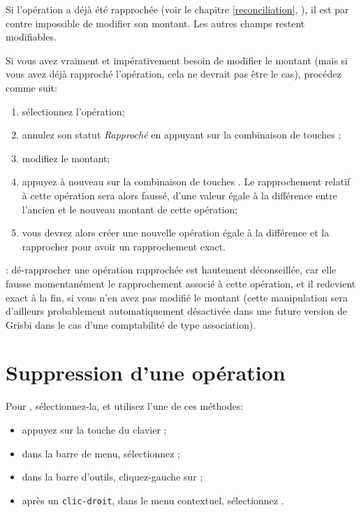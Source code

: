 Si l'opération a déjà été rapprochée (voir le chapitre \vref{reconciliation}, ), il est par contre impossible de modifier son montant. Les autres champs restent modifiables.

Si vous avez vraiment et impérativement besoin de modifier le montant (mais si vous avez déjà rapproché l'opération, cela ne devrait pas être le cas), procédez comme suit:
\begin{enumerate}
	\item sélectionnez l'opération;
	\item annulez son statut \emph{Rapproché} en appuyant sur la combinaison de touches ;
	\item modifiez le montant;
	\item appuyez à nouveau sur la combinaison de touches . Le rapprochement relatif à cette opération sera alors faussé, d'une valeur égale à la différence entre l'ancien et le nouveau montant de cette opération;
	\item vous devrez alors créer une nouvelle opération égale à la différence et la rapprocher pour avoir un rapprochement exact.
\end{enumerate}

\Attention{}: dé-rapprocher une opération rapprochée est hautement déconseillée, car elle fausse momentanément le rapprochement associé à cette opération, et il redevient exact à la fin, si vous n'en avez pas modifié le montant (cette manipulation sera d'ailleurs probablement automatiquement désactivée dans une future version de Grisbi dans le cas d'une comptabilité de type association).


\section{Suppression d'une opération\label{transactions-delete}}

Pour , sélectionnez-la, et utilisez l'une de ces méthodes:
\begin{itemize}
	\item appuyez sur la touche du clavier ;
	\item dans la barre de menu, sélectionnez ;
	\item dans la barre d'outils, cliquez-gauche sur ;
	\item après un \texttt{clic-droit}, dans le menu contextuel, sélectionnez .
\end{itemize}

